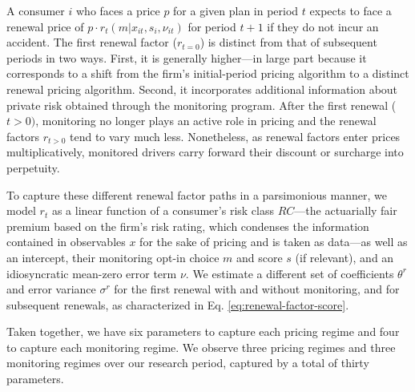 A consumer $i$ who faces a price $p$ for a given plan in period $t$ expects to face a renewal price of $p \cdot r_t(m|x_{it}, s_i, \nu_{it})$ for period $t+1$ if they do not incur an accident. The first renewal factor ($r_{t=0}$) is distinct from that of subsequent periods in two ways. First, it is generally higher---in large part because it corresponds to a shift from the firm's initial-period pricing algorithm to a distinct renewal pricing algorithm. Second, it incorporates additional information about private risk obtained through the monitoring program. After the first renewal ($t>0)$, monitoring no longer plays an active role in pricing and the renewal factors $r_{t>0}$ tend to vary much less. Nonetheless, as renewal factors enter prices multiplicatively, monitored drivers carry forward their discount or surcharge into perpetuity.

To capture these different renewal factor paths in a parsimonious manner, we model $r_t$ as a linear function of a consumer's risk class $RC$---the actuarially fair premium based on the firm's risk rating, which condenses the information contained in observables $x$ for the sake of pricing and is taken as data---as well as an intercept, their monitoring opt-in choice $m$ and score $s$ (if relevant), and an idiosyncratic mean-zero error term $\nu$. We estimate a different set of coefficients $\theta^{r}$ and error variance $\sigma^{r}$ for the first renewal with and without monitoring, and for subsequent renewals, as characterized in Eq. \ref{eq:renewal-factor-score}.

Taken together, we have six parameters to capture each pricing regime and four to capture each monitoring regime. We observe three pricing regimes and three monitoring regimes over our research period, captured by a total of thirty parameters.


